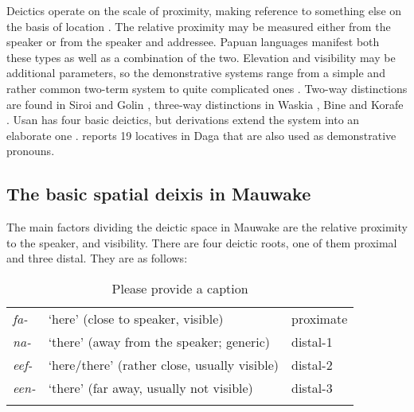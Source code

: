 Deictics operate on the scale of proximity, making reference to something else on the basis of location \citep[57--58]{HallidayEtAl1976}. The relative proximity may be measured either from the speaker or from the speaker and addressee. Papuan languages manifest both these types as well as a combination of the two. Elevation and visibility may be additional parameters, so the demonstrative systems range from a simple and rather common two-term system to quite complicated ones \citep[75--77]{Foley1986}. Two-way distinctions are found in Siroi \citep[20]{Wells1979} and Golin \citep{Bunn1974}, three-way distinctions in Waskia \citep[59]{RossEtAl1978}%
, Bine \citep{Saari1985} and Korafe \citep[65]{FarrEtAl1981}%
. Usan has four basic deictics, but derivations extend the system into an elaborate one \citep[76--81]{Reesink1987}. \citet[38--39]{Murane1974} reports 19 locatives in Daga that are also used as demonstrative pronouns. 

\subsection{The basic spatial deixis in Mauwake}\label{sec:3:y:x}
{}
The main factors dividing the deictic space in Mauwake are the relative proximity to the speaker, and visibility. There are four deictic roots, one of them proximal and three distal. They are as follows: 

\begin{table}
\caption{Please provide a caption}
\label{} 
\begin{tabular}{>{\itshape}lll}
\mytoprule
fa- &`here' (close to speaker, visible) &proximate\\
na- &`there' (away from the speaker; generic) &distal-1\\
eef- &`here/there' (rather close, usually visible) &distal-2\\
een- &`there' (far away, usually not visible) &distal-3\\
\mybottomrule
\end{tabular}
\end{table}



